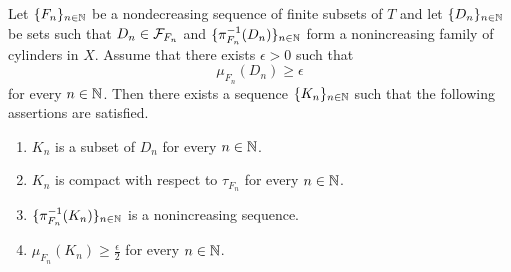 \documentclass[10pt]{amsart}
\begin{document}
\begin{lemma}\label{lemma:inner_regularity_in_Daniell_Kolmogorov_extension}
	Let $\{F_n\}_{n\in {\mathbb N}}$ be a nondecreasing sequence of finite subsets of $T$ and let $\{D_n\}_{n\in {\mathbb N}}$ be sets such that $D_n\in {\mathcal F}_{F_n}$ and $\{\pi_{F_n}^{-1}(D_n)\}_{n\in {\mathbb N}}$ form a nonincreasing family of cylinders in $X$. Assume that there exists $\epsilon > 0$ such that
	$$\mu_{F_n}(D_n) \geq \epsilon$$
	for every $n\in {\mathbb N}$. Then there exists a sequence $\{K_n\}_{n\in {\mathbb N}}$ such that the following assertions are satisfied.
	\begin{enumerate}[label=\emph{\textbf{(\arabic*)}}, leftmargin=*]
		\item $K_n$ is a subset of $D_n$ for every $n\in {\mathbb N}$.
		\item $K_n$ is compact with respect to $\tau_{F_n}$ for every $n\in {\mathbb N}$.
		\item $\{\pi^{-1}_{F_n}(K_n)\}_{n\in {\mathbb N}}$ is a nonincreasing sequence.
		\item $\mu_{F_n}(K_n) \geq \frac{\epsilon}{2}$ for every $n\in {\mathbb N}$.
	\end{enumerate}
\end{lemma}
\end{document}
